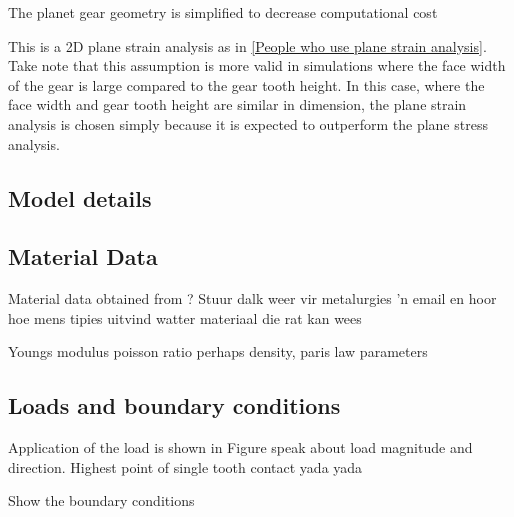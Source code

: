 The planet gear geometry is simplified to decrease computational cost


This is a 2D plane strain analysis as in \ref{People who use plane strain analysis}. Take note that this assumption is more valid in simulations where the face width of the gear is large compared to the gear tooth height. In this case, where the face width and gear tooth height are similar in dimension, the plane strain analysis is chosen simply because it is expected to outperform the plane stress analysis. 

\subsection{Model details}

	\begin{table}[]
		\centering
	\end{table}


\subsection{Material Data}
Material data obtained from ? Stuur dalk weer vir metalurgies 'n email en hoor hoe mens tipies uitvind watter materiaal die rat kan wees

Youngs modulus poisson ratio perhaps density, paris law parameters


\subsection{Loads and boundary conditions}
Application of the load is shown in Figure
speak about load magnitude and direction. Highest point of single tooth contact yada yada


Show the boundary conditions

